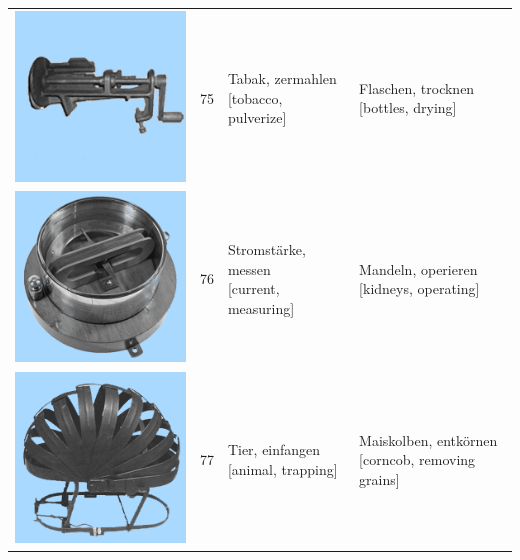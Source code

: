 \documentclass[
  english,
  doc,12pt,twoside,floatsintext]{apa7}
\begin{document}
\begin{center}
\begin{ThreePartTable}
{\begin{longtable}{llll}
\includegraphics[valign=c, scale=0.23]{../materials/unfamiliar/75.png} & 75 & \makecell[l]{Tabak, zermahlen\\{[tobacco, pulverize]}} & \makecell[l]{Flaschen, trocknen\\{[bottles, drying]}}\\
\includegraphics[valign=c, scale=0.23]{../materials/unfamiliar/76.png} & 76 & \makecell[l]{Stromstärke, messen\\{[current, measuring]}} & \makecell[l]{Mandeln, operieren\\{[kidneys, operating]}}\\
\includegraphics[valign=c, scale=0.23]{../materials/unfamiliar/77.png} & 77 & \makecell[l]{Tier, einfangen\\{[animal, trapping]}} & \makecell[l]{Maiskolben, entkörnen\\{[corncob, removing grains]}}\\

\end{longtable}}
\end{ThreePartTable}
\end{center}
\end{document}
